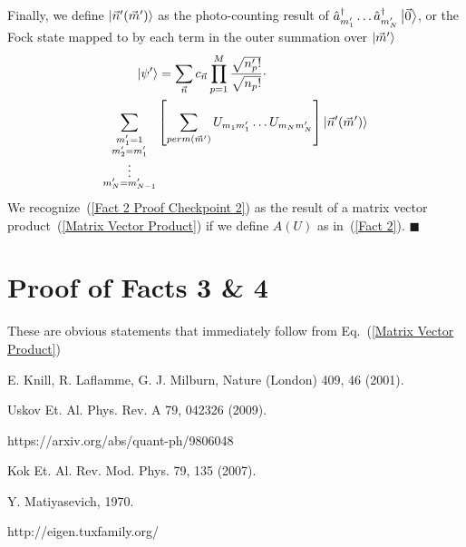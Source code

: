 \documentclass[aps,pra,twocolumn,showpacs,superscriptaddress,floatfix,10pt]{revtex4}
\begin{document}
Finally, we define $\ket{\vec{n}^\prime(\vec{m}^\prime)}$ as the photo-counting result of $\hat{a}_{m_1^\prime}^\dagger \dots \hat{a}_{m_N^\prime}^\dagger \ket{\vec{0}}$, or the Fock state mapped to by each term in the outer summation over $\ket{\vec{m}^\prime}$
\begin{eqnarray}
\label{Fact 2 Proof Checkpoint 2}
\ket{\psi^\prime} = \sum_{\vec{n}} c_{\vec{n}} \prod_{p=1}^{M} \frac{\sqrt{n_p^\prime !}}{ \sqrt{n_p !}} \cdot \quad \quad \quad \quad \quad \quad \quad \quad \\ \sum_{\substack{m_1^\prime = 1\\
		m_2^\prime = m_1^\prime\\
		\vdots \\
		m_N^\prime = m_{N-1}^\prime}}
\left[ \sum_{perm(\vec{m}^\prime)} U_{m_1 m_1^\prime} \dots U_{m_N m_N^\prime} \right] \ket{\vec{n}^\prime (\vec{m}^\prime) }
\end{eqnarray}
We recognize~(\ref{Fact 2 Proof Checkpoint 2}) as the result of a matrix vector product~(\ref{Matrix Vector Product}) if we define $A(U)$ as in~(\ref{Fact 2}).  $ \blacksquare $
\section{Proof of Facts 3 \& 4}
These are obvious statements that immediately follow from Eq.~(\ref{Matrix Vector Product})

\begin{thebibliography}{99}

  E. Knill, R. Laflamme, G. J. Milburn, Nature (London) 409, 46 (2001).

 Uskov Et. Al.
Phys. Rev. A 79, 042326 (2009).

 https://arxiv.org/abs/quant-ph/9806048

 Kok Et. Al.
Rev. Mod. Phys. 79, 135 (2007).

 Y. Matiyasevich, 1970.

 http://eigen.tuxfamily.org/

\end{thebibliography}
\end{document}

